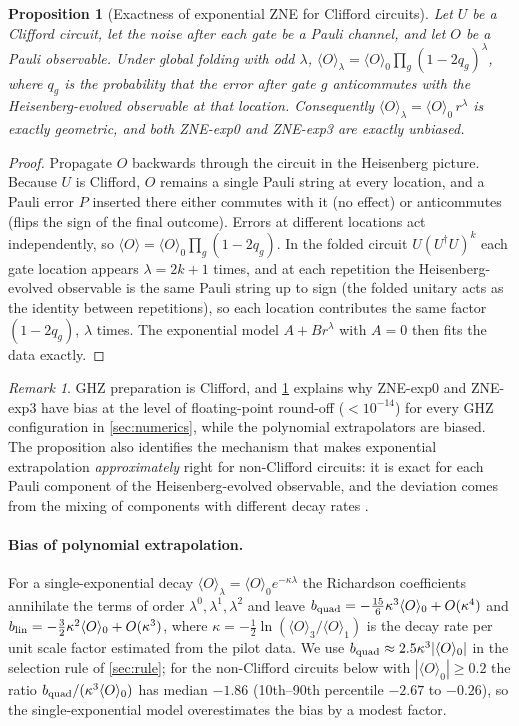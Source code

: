 \documentclass[11pt,a4paper]{article}
\newtheorem{proposition}{Proposition}
\theoremstyle{remark}
\newtheorem{remark}{Remark}
\begin{document}
\begin{proposition}[Exactness of exponential ZNE for Clifford circuits]
\label{prop:clifford}
Let $U$ be a Clifford circuit, let the noise after each gate be a Pauli channel, and let $O$ be a Pauli observable. Under global folding with odd $\lambda$, $\langle O\rangle_\lambda = \langle O\rangle_0\prod_g (1-2q_g)^{\lambda}$, where $q_g$ is the probability that the error after gate $g$ anticommutes with the Heisenberg-evolved observable at that location. Consequently $\langle O\rangle_\lambda = \langle O\rangle_0\,r^\lambda$ is exactly geometric, and both ZNE-exp0 and ZNE-exp3 are exactly unbiased.
\end{proposition}
\begin{proof}
Propagate $O$ backwards through the circuit in the Heisenberg picture. Because $U$ is Clifford, $O$ remains a single Pauli string at every location, and a Pauli error $P$ inserted there either commutes with it (no effect) or anticommutes (flips the sign of the final outcome). Errors at different locations act independently, so $\langle O\rangle = \langle O\rangle_0\prod_g(1-2q_g)$. In the folded circuit $U(U^\dagger U)^k$ each gate location appears $\lambda=2k+1$ times, and at each repetition the Heisenberg-evolved observable is the same Pauli string up to sign (the folded unitary acts as the identity between repetitions), so each location contributes the same factor $(1-2q_g)$, $\lambda$ times. The exponential model $A+Br^\lambda$ with $A=0$ then fits the data exactly.
\end{proof}
\begin{remark}
GHZ preparation is Clifford, and \cref{prop:clifford} explains why ZNE-exp0 and ZNE-exp3 have bias at the level of floating-point round-off ($<10^{-14}$) for every GHZ configuration in \cref{sec:numerics}, while the polynomial extrapolators are biased. The proposition also identifies the mechanism that makes exponential extrapolation \emph{approximately} right for non-Clifford circuits: it is exact for each Pauli component of the Heisenberg-evolved observable, and the deviation comes from the mixing of components with different decay rates \cite{cai2021}.
\end{remark}

\paragraph{Bias of polynomial extrapolation.}
For a single-exponential decay $\langle O\rangle_\lambda=\langle O\rangle_0e^{-\kappa\lambda}$ the Richardson coefficients annihilate the terms of order $\lambda^0,\lambda^1,\lambda^2$ and leave $b_{\rm quad}=-\tfrac{15}{6}\kappa^3\langle O\rangle_0+O(\kappa^4)$ and $b_{\rm lin}=-\tfrac32\kappa^2\langle O\rangle_0+O(\kappa^3)$, where $\kappa=-\tfrac12\ln(\langle O\rangle_3/\langle O\rangle_1)$ is the decay rate per unit scale factor estimated from the pilot data. We use $b_{\rm quad}\approx 2.5\kappa^3|\langle O\rangle_0|$ in the selection rule of \cref{sec:rule}; for the non-Clifford circuits below with $|\langle O\rangle_0|\ge0.2$ the ratio $b_{\rm quad}/(\kappa^3\langle O\rangle_0)$ has median $-1.86$ (10th--90th percentile $-2.67$ to $-0.26$), so the single-exponential model overestimates the bias by a modest factor.
\end{document}
